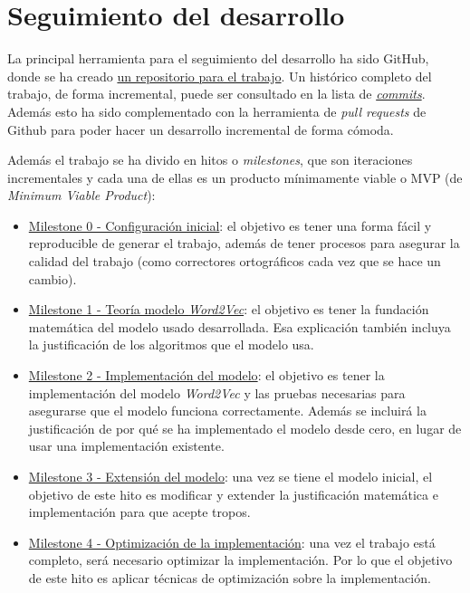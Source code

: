\section{Seguimiento del desarrollo}

La principal herramienta para el seguimiento del desarrollo ha sido GitHub, donde se ha creado \href{https://github.com/antoniogamiz/tfg}{un repositorio para el trabajo}.
Un histórico completo del trabajo, de forma incremental, puede ser consultado en la lista de \href{https://github.com/antoniogamiz/tfg/commits/main}{\textit{commits}}.
Además esto ha sido complementado con la herramienta de \textit{pull requests} de Github para poder hacer un desarrollo incremental de forma cómoda.

Además el trabajo se ha divido en hitos o \textit{milestones}, que son iteraciones incrementales y cada una de ellas es un producto mínimamente viable o MVP
(de \textit{Minimum Viable Product}):

\begin{itemize}
      \item \href{https://github.com/antoniogamiz/tfg/milestone/1}{Milestone 0 - Configuración inicial}: el objetivo es tener una forma fácil y reproducible de generar el trabajo,
      además de tener procesos para asegurar la calidad del trabajo (como correctores ortográficos cada vez que se hace un cambio).
      \item \href{https://github.com/antoniogamiz/tfg/milestone/4}{Milestone 1 - Teoría modelo \textit{Word2Vec}}: el objetivo es tener la fundación matemática del modelo usado desarrollada.
      Esa explicación también incluya la justificación de los algoritmos que el modelo usa.
      \item \href{https://github.com/antoniogamiz/tfg/milestone/6}{Milestone 2 - Implementación del modelo}: el objetivo es tener la implementación del modelo \textit{Word2Vec} y las pruebas
      necesarias para asegurarse que el modelo funciona correctamente. Además se incluirá la justificación de por qué se ha implementado el modelo desde cero, en lugar de usar
      una implementación existente.
      \item \href{https://github.com/antoniogamiz/tfg/milestone/7}{Milestone 3 - Extensión del modelo}: una vez se tiene el modelo inicial, el objetivo de este hito es modificar y extender la justificación
      matemática e implementación para que acepte tropos.
      \item \href{https://github.com/antoniogamiz/tfg/milestone/8}{Milestone 4 - Optimización de la implementación}: una vez el trabajo está completo, será necesario optimizar la implementación. Por lo que el
      objetivo de este hito es aplicar técnicas de optimización sobre la implementación.
\end{itemize}
